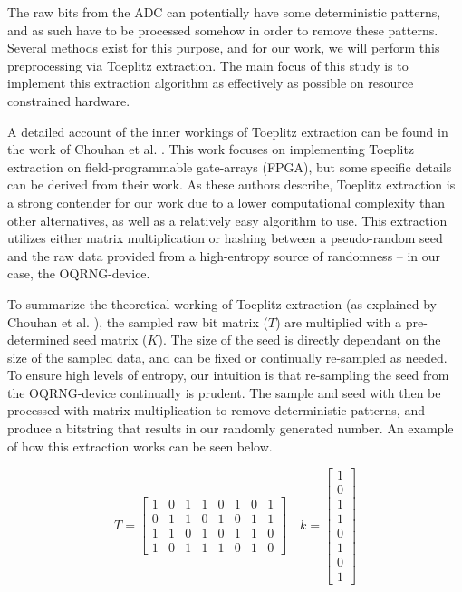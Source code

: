 \documentclass{sigchi}
\begin{document}
The raw bits from the ADC can potentially have some deterministic patterns, and as such have to be processed somehow in order to remove these patterns. Several methods exist for this purpose, and for our work, we will perform this preprocessing via Toeplitz extraction. The main focus of this study is to implement this extraction algorithm as effectively as possible on resource constrained hardware.

A detailed account of the inner workings of Toeplitz extraction can be found in the work of Chouhan et al. \cite{toeplitz-desc}. This work focuses on implementing Toeplitz extraction on field-programmable gate-arrays (FPGA), but some specific details can be derived from their work. As these authors describe, Toeplitz extraction is a strong contender for our work due to a lower computational complexity than other alternatives, as well as a relatively easy algorithm to use. This extraction utilizes either matrix multiplication or hashing between a pseudo-random seed and the raw data provided from a high-entropy source of randomness -- in our case, the OQRNG-device.

To summarize the theoretical working of Toeplitz extraction (as explained by Chouhan et al. \cite{toeplitz-desc}), the sampled raw bit matrix (\(T\)) are multiplied with a pre-determined seed matrix (\(K\)). The size of the seed is directly dependant on the size of the sampled data, and can be fixed or continually re-sampled as needed. To ensure high levels of entropy, our intuition is that re-sampling the seed from the OQRNG-device continually is prudent. The sample and seed with then be processed with matrix multiplication to remove deterministic patterns, and produce a bitstring that results in our randomly generated number. An example of how this extraction works can be seen below.

\[
T =
\begin{bmatrix}
1 & 0 & 1 & 1 & 0 & 1 & 0 & 1 \\
0 & 1 & 1 & 0 & 1 & 0 & 1 & 1 \\
1 & 1 & 0 & 1 & 0 & 1 & 1 & 0 \\
1 & 0 & 1 & 1 & 1 & 0 & 1 & 0
\end{bmatrix}
\quad
k =
\begin{bmatrix}
1 \\ 0 \\ 1 \\ 1 \\ 0 \\ 1 \\ 0 \\ 1
\end{bmatrix}
\]
\end{document}
